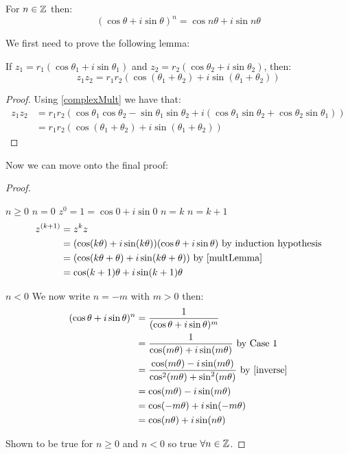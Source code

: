 \documentclass[../main.tex]{subfiles}
\begin{document}
\begin{theorem}
  For $n \in \mathbb{Z}$ then:
  \[
    (\cos \theta + i \sin \theta)^n = \cos n\theta + i \sin n\theta
  \] 
\end{theorem}
We first need to prove the following lemma:
\begin{lemma}
  If $z_1 = r_1(\cos \theta_1 + i \sin \theta_1)$ and $z_2 = r_2(\cos \theta_2 + i \sin \theta_2)$, then:
  \[
    z_1 z_2 = r_1 r_2 (\cos (\theta_1 + \theta_2) + i\sin(\theta_1 + \theta_2))
  \]
  \label{multLemma}
\end{lemma}
\begin{proof}
  Using \cref{complexMult} we have that:
  \begin{align*}
    z_1 z_2 &= r_1 r_2 (\cos \theta_1 \cos \theta_2 - \sin \theta_1 \sin \theta_2 + i(\cos \theta_1 \sin \theta_2 + \cos \theta_2 \sin \theta_1)) \\
            &= r_1 r_2 (\cos(\theta_1 + \theta_2) + i\sin(\theta_1 + \theta_2))
  \end{align*} 
\end{proof}
Now we can move onto the final proof:
\begin{proof}
  \begin{proofcases}
    \begin{case}{$n \geq 0$}
      \induction
      {$n = 0$}{
        $z^0 = 1 = \cos 0 + i \sin 0$ \tick
      }
      {$n = k$}{}
      {$n = k + 1$}{
        \begin{align*}
          z^{(k+1)} &= z^k z \\
                    &= (\cos(k\theta) + i\sin(k\theta))(\cos \theta + i\sin \theta) \text{ by induction hypothesis}\\
                    &= (\cos(k\theta + \theta) + i\sin(k\theta + \theta)) \text{ by \cref{multLemma}}\\
                    &= \cos(k + 1)\theta + i \sin(k + 1)\theta
        \end{align*} 
      }
    \end{case}
    \begin{case}{$n < 0$}
      We now write $n = -m$ with $m > 0$ then:
      \begin{align*}
        (\cos \theta + i \sin \theta)^n &= \frac{1}{(\cos \theta + i \sin \theta)^m} \\
                                        &= \frac{1}{\cos(m\theta) + i\sin(m\theta)} \text{ by Case 1}\\
                                        &= \frac{\cos(m\theta) - i\sin(m\theta)}{\cos^2(m\theta) + \sin^2(m\theta)} \text{ by \cref{inverse}}\\
                                        &= \cos(m\theta) - i\sin(m\theta) \\
                                        &= \cos(-m\theta) + i\sin(-m\theta) \\
                                        &= \cos(n\theta) + i\sin(n\theta)
      \end{align*}
    \end{case} 
  \end{proofcases}
  Shown to be true for $n \geq 0$ and $n < 0$ so true $\forall n \in \mathbb{Z}$.
\end{proof}
\end{document}
